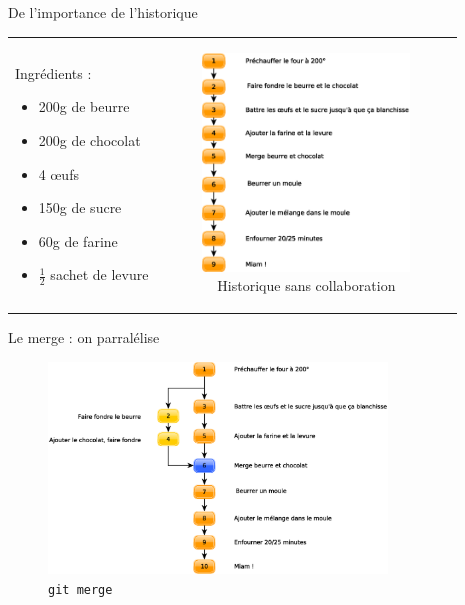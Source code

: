 \documentclass[xcolor=x11names,compress]{beamer}
\begin{document}
\begin{frame}{De l'importance de l'historique}
	\begin{tabular}{lc}
	\begin{minipage}{0.4\textwidth}
	Ingrédients : 
	\begin{itemize}
		\item 200g de beurre
		\item 200g de chocolat
		\item 4 œufs
		\item 150g de sucre
		\item 60g de farine
		\item $\frac{1}{2}$ sachet de levure
	\end{itemize}
	\end{minipage}
	&
	\begin{minipage}{0.6\textwidth}
		\begin{figure}[H]
			\includegraphics[width=5.5cm]{images/3-collaboration/sansbranche.eps}
			\caption{Historique sans collaboration}
		\end{figure}
	\end{minipage}
	\end{tabular}

\end{frame}
\begin{frame}{Le merge : on parralélise}
	\begin{figure}[H]
		\includegraphics[width=9cm]{images/3-collaboration/merge.eps}
		\caption{\texttt{git merge}}
	\end{figure}
\end{frame}
\end{document}
